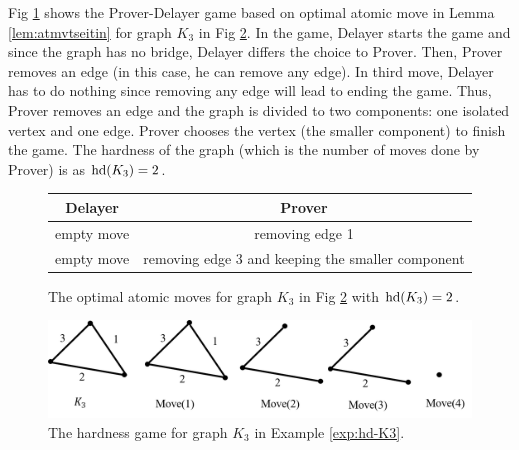\documentclass{report}
\begin{document}
\begin{examp}\label{exp:hd-K3}
Fig \ref{fig:game1} shows the Prover-Delayer game based on optimal atomic move in Lemma \ref{lem:atmvtseitin} for graph $K_3$ in Fig \ref{fig:hd1}. In the game, Delayer starts the game and since the graph has no bridge, Delayer differs the choice to Prover. Then, Prover removes an edge (in this case, he can remove any edge). In third move, Delayer has to do nothing since removing any edge will lead to ending the game. Thus, Prover removes an edge and the graph is divided to two components: one isolated vertex and one edge. Prover chooses the vertex (the smaller component) to finish the game. The hardness of the graph (which is the number of moves done by Prover) is as $\operatorname{hd}(K_3)=2$.
  \begin{figure}%
  \centering
  \begin{tabular}{|c|c|} 
                  \hline
                  Delayer & Prover \\ \hline
                  empty move & removing edge 1  \\ \hline
                  empty move & removing edge 3 and keeping the smaller component \\ \hline
  \end{tabular}
  \caption{The optimal atomic moves for graph $K_3$ in Fig \ref{fig:hd1} with $\operatorname{hd}(K_3)=2$.}  \label{fig:game1}
  \end{figure}
  \begin{figure}
  \begin{center}
  \includegraphics[scale =0.45]{g1.png}
  \caption{The hardness game for graph $K_3$ in Example \ref{exp:hd-K3}.} \label{fig:hd1}
  \end{center}
  \end{figure}
\end{examp}
\end{document}
